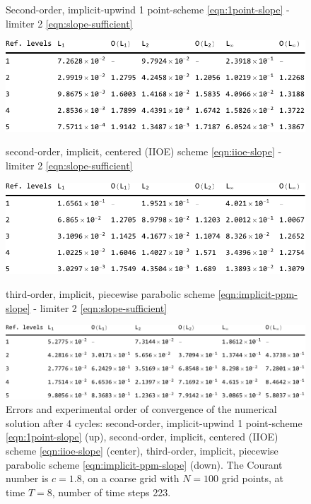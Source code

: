 \documentclass[../thesis.tex]{subfiles}
\begin{document}
\begin{figure}[H]
	\centering
    \caption*{Second-order, implicit-upwind 1 point-scheme \eqref{eqn:1point-slope} - limiter 2 \eqref{eqn:slope-sufficient}}
	\includegraphics[width=\textwidth]{../tab/tab-1point-c1p8-T8-limit2-smooth.pdf}
    \caption*{second-order, implicit, centered (IIOE) scheme \eqref{eqn:iioe-slope} - limiter 2 \eqref{eqn:slope-sufficient}}
	\includegraphics[width=\textwidth]{../tab/tab-iioe-c1p8-T8-limit2-smooth.pdf}
    \caption*{third-order, implicit, piecewise parabolic scheme \eqref{eqn:implicit-ppm-slope} - limiter 2 \eqref{eqn:slope-sufficient}}
	\includegraphics[width=\textwidth]{../tab/tab-implicit-ppm-c1p8-T8-limit2-smooth.pdf}
	\caption{Errors and experimental order of convergence of the numerical solution after 4 cycles: second-order, implicit-upwind 1 point-scheme \eqref{eqn:1point-slope} (up), second-order, implicit, centered (IIOE) scheme \eqref{eqn:iioe-slope} (center), third-order, implicit, piecewise parabolic scheme \eqref{eqn:implicit-ppm-slope} (down). The Courant number is \(c = 1.8\), on a coarse grid with \(N = 100\) grid points, at time \(T = 8\), number of time steps 223.}
	\label{tab:c1p8-T8-limit2-smooth}
\end{figure}
\end{document}
